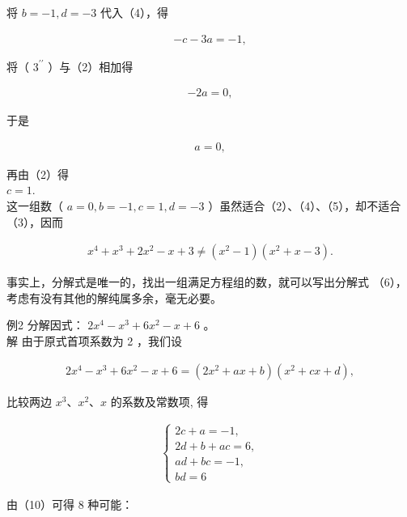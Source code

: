 \documentclass[10pt]{article}
\begin{document}
将 $b=-1, d=-3$ 代入（4），得

\begin{align*}
-c-3 a=-1,
\end{align*}

将（ $3^{\prime \prime}$ ）与（2）相加得

\begin{align*}
-2 a=0,
\end{align*}

于是

\begin{align*}
a=0,
\end{align*}

再由（2）得\\
$c=1$.\\
这一组数（ $a=0, b=-1, c=1, d=-3$ ）虽然适合（2）、（4）、（5），却不适合（3），因而

\begin{align*}
x^{4}+x^{3}+2 x^{2}-x+3 \neq\left(x^{2}-1\right)\left(x^{2}+x-3\right) .
\end{align*}

事实上，分解式是唯一的，找出一组满足方程组的数，就可以写出分解式 （6），考虑有没有其他的解纯属多余，毫无必要。

例2 分解因式： $2 x^{4}-x^{3}+6 x^{2}-x+6$ 。\\
解 由于原式首项系数为 2 ，我们设

\begin{align*}
2 x^{4}-x^{3}+6 x^{2}-x+6=\left(2 x^{2}+a x+b\right)\left(x^{2}+c x+d\right),
\end{align*}

比较两边 $x^{3} 、 x^{2} 、 x$ 的系数及常数项, 得

\begin{align*}
\left\{\begin{array}{l}
2 c+a=-1,  \tag{7}\\
2 d+b+a c=6, \\
a d+b c=-1, \\
b d=6
\end{array}\right.
\end{align*}

由（10）可得 8 种可能：
\end{document}
